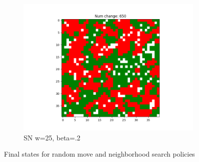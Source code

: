 \documentclass[11pt]{article}
\begin{document}
\begin{figure}[h]
\begin{subfigure}{0.14\textwidth}
			\includegraphics[width=\linewidth]{final_rachael_w25b20.png}
			\caption{\centering SN w=25, beta=.2}
			\label{sn_finalw20b20}
		\end{subfigure}
		\caption{Final states for random move and neighborhood search policies}
		\label{sn_finalstate}
	\end{figure}
	\FloatBarrier
	
\end{document}
